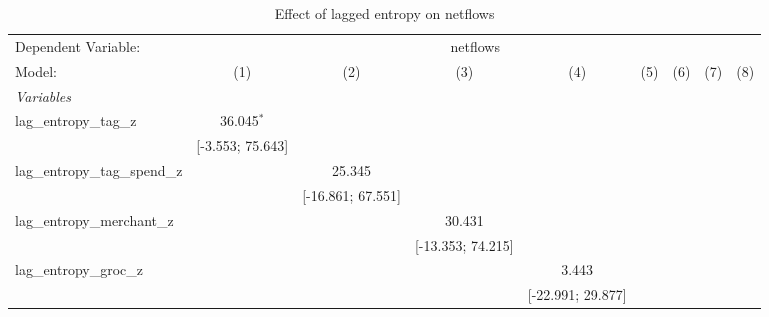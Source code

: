 
\begin{table}[htbp]
   \centering
   \tiny
   \begin{threeparttable}[b]
      \caption{\label{tab:reg_netflows_lagged} Effect of lagged entropy on netflows}
      \begin{tabular}{lcccccccc}
         \tabularnewline \midrule \midrule
         Dependent Variable: & \multicolumn{8}{c}{netflows}\\
         Model:                           & (1)                  & (2)                  & (3)                  & (4)                  & (5)                  & (6)                  & (7)                  & (8)\\  
         \midrule
         \emph{Variables}\\
         lag\_entropy\_tag\_z             & 36.045$^{*}$         &                      &                      &                      &                      &                      &                      &   \\   
                                          & [-3.553; 75.643]     &                      &                      &                      &                      &                      &                      &   \\   
         lag\_entropy\_tag\_spend\_z      &                      & 25.345               &                      &                      &                      &                      &                      &   \\   
                                          &                      & [-16.861; 67.551]    &                      &                      &                      &                      &                      &   \\   
         lag\_entropy\_merchant\_z        &                      &                      & 30.431               &                      &                      &                      &                      &   \\   
                                          &                      &                      & [-13.353; 74.215]    &                      &                      &                      &                      &   \\   
         lag\_entropy\_groc\_z            &                      &                      &                      & 3.443                &                      &                      &                      &   \\   
                                          &                      &                      &                      & [-22.991; 29.877]    &                      &                      &                      &   \\   

\end{tabular}
\end{threeparttable}
\end{table}
